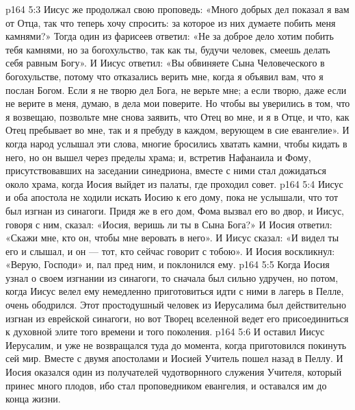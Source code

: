 \vs p164 5:3 Иисус же продолжал свою проповедь: «Много добрых дел показал я вам от Отца, так что теперь хочу спросить: за которое из них думаете побить меня камнями?» Тогда один из фарисеев ответил: «Не за доброе дело хотим побить тебя камнями, но за богохульство, так как ты, будучи человек, смеешь делать себя равным Богу». И Иисус ответил: «Вы обвиняете Сына Человеческого в богохульстве, потому что отказались верить мне, когда я объявил вам, что я послан Богом. Если я не творю дел Бога, не верьте мне; а если творю, даже если не верите в меня, думаю, в дела мои поверите. Но чтобы вы уверились в том, что я возвещаю, позвольте мне снова заявить, что Отец во мне, и я в Отце, и что, как Отец пребывает во мне, так и я пребуду в каждом, верующем в сие евангелие». И когда народ услышал эти слова, многие бросились хватать камни, чтобы кидать в него, но он вышел через пределы храма; и, встретив Нафанаила и Фому, присутствовавших на заседании синедриона, вместе с ними стал дожидаться около храма, когда Иосия выйдет из палаты, где проходил совет.
\vs p164 5:4 Иисус и оба апостола не ходили искать Иосию к его дому, пока не услышали, что тот был изгнан из синагоги. Придя же в его дом, Фома вызвал его во двор, и Иисус, говоря с ним, сказал: «Иосия, веришь ли ты в Сына Бога?» И Иосия ответил: «Скажи мне, кто он, чтобы мне веровать в него». И Иисус сказал: «И видел ты его и слышал, и он --- тот, кто сейчас говорит с тобою». И Иосия воскликнул: «Верую, Господи» и, пал пред ним, и поклонился ему.
\vs p164 5:5 Когда Иосия узнал о своем изгнании из синагоги, то сначала был сильно удручен, но потом, когда Иисус велел ему немедленно приготовиться идти с ними в лагерь в Пелле, очень ободрился. Этот простодушный человек из Иерусалима был действительно изгнан из еврейской синагоги, но вот Творец вселенной ведет его присоединиться к духовной элите того времени и того поколения.
\vs p164 5:6 И оставил Иисус Иерусалим, и уже не возвращался туда до момента, когда приготовился покинуть сей мир. Вместе с двумя апостолами и Иосией Учитель пошел назад в Пеллу. И Иосия оказался один из получателей чудотворнного служения Учителя, который принес много плодов, ибо стал проповедником евангелия, и оставался им до конца жизни.
